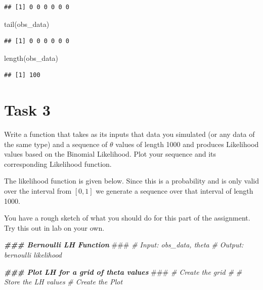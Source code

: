 \documentclass[
]{article}
\newenvironment{Shaded}{\begin{snugshade}}{\end{snugshade}}
\newcommand{\AlertTok}[1]{\textcolor[rgb]{0.94,0.16,0.16}{#1}}
\newcommand{\CommentTok}[1]{\textcolor[rgb]{0.56,0.35,0.01}{\textit{#1}}}
\newcommand{\DocumentationTok}[1]{\textcolor[rgb]{0.56,0.35,0.01}{\textbf{\textit{#1}}}}
\newcommand{\FunctionTok}[1]{\textcolor[rgb]{0.00,0.00,0.00}{#1}}
\newcommand{\NormalTok}[1]{#1}
\begin{document}
\begin{verbatim}
## [1] 0 0 0 0 0 0
\end{verbatim}

\begin{Shaded}
\begin{Highlighting}[]
\FunctionTok{tail}\NormalTok{(obs\_data)}
\end{Highlighting}
\end{Shaded}

\begin{verbatim}
## [1] 0 0 0 0 0 0
\end{verbatim}

\begin{Shaded}
\begin{Highlighting}[]
\FunctionTok{length}\NormalTok{(obs\_data)}
\end{Highlighting}
\end{Shaded}

\begin{verbatim}
## [1] 100
\end{verbatim}

\hypertarget{task-3}{%
\section{Task 3}\label{task-3}}

Write a function that takes as its inputs that data you simulated (or
any data of the same type) and a sequence of \(\theta\) values of length
1000 and produces Likelihood values based on the Binomial Likelihood.
Plot your sequence and its corresponding Likelihood function.

The likelihood function is given below. Since this is a probability and
is only valid over the interval from \([0, 1]\) we generate a sequence
over that interval of length 1000.

You have a rough sketch of what you should do for this part of the
assignment. Try this out in lab on your own.

\begin{Shaded}
\begin{Highlighting}[]
\DocumentationTok{\#\#\# Bernoulli LH Function }\AlertTok{\#\#\#}
\CommentTok{\# Input: obs\_data, theta}
\CommentTok{\# Output: bernoulli likelihood}


\DocumentationTok{\#\#\# Plot LH for a grid of theta values }\AlertTok{\#\#\#}
\CommentTok{\# Create the grid \#}
\CommentTok{\# Store the LH values}
\CommentTok{\# Create the Plot}
\end{Highlighting}
\end{Shaded}
\end{document}
